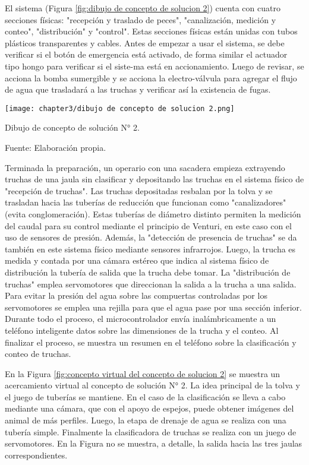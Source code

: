 El sistema (Figura \ref{fig:dibujo de concepto de solucion 2}) cuenta con cuatro secciones físicas: "recepción y traslado de peces", "canalización, medición y conteo", "distribución" y "control". Estas secciones físicas están unidas con tubos plásticos transparentes y cables. Antes de empezar a usar el sistema, se debe verificar si el botón de emergencia está activado, de forma similar el actuador tipo hongo para verificar si el siste-ma está en accionamiento. Luego de revisar, se acciona la bomba sumergible y se acciona la electro-válvula para agregar el flujo de agua que trasladará a las truchas y verificar así la existencia de fugas.



\begin{myfigure}[H]
	\footnotesize\centering
	\texttt{[image: chapter3/dibujo de concepto de solucion 2.png]}
	\caption{Dibujo de concepto de solución N° 2.}
	\begin{myflushcenter}
		Fuente: Elaboración propia.
	\end{myflushcenter}
	\label{fig:dibujo de concepto de solucion 2}
\end{myfigure}

Terminada la preparación, un operario con una sacadera empieza extrayendo truchas de una jaula sin clasificar y depositando las truchas en el sistema físico de "recepción de truchas". Las truchas depositadas resbalan por la tolva y se trasladan hacia las tuberías de reducción que funcionan como "canalizadores" (evita conglomeración). Estas tuberías de diámetro distinto permiten la medición del caudal para su control mediante el principio de Venturi, en este caso con el uso de sensores de presión. Además, la "detección de presencia de truchas" se da también en este sistema físico mediante sensores infrarrojos. Luego, la trucha es medida y contada por una cámara estéreo que indica al sistema físico de distribución la tubería de salida que la trucha debe tomar. La "distribución de truchas" emplea servomotores que direccionan la salida a la trucha a una salida. Para evitar la presión del agua sobre las compuertas controladas por los servomotores se emplea una rejilla para que el agua pase por una sección inferior. 
Durante todo el proceso, el microcontrolador envía inalámbricamente a un teléfono inteligente datos sobre las dimensiones de la trucha y el conteo. Al finalizar el proceso, se muestra un resumen en el teléfono sobre la clasificación y conteo de truchas.

En la Figura \ref{fig:concepto virtual del concepto de solucion 2} se muestra un acercamiento virtual al concepto de solución N° 2. La idea principal de la tolva y el juego de tuberías se mantiene. En el caso de la clasificación se lleva a cabo mediante una cámara, que con el apoyo de espejos, puede obtener imágenes del animal de más perfiles. Luego, la etapa de drenaje de agua se realiza con una tubería simple. Finalmente la clasificadora de truchas se realiza con un juego de servomotores. En la Figura no se muestra, a detalle, la salida hacia las tres jaulas correspondientes.

